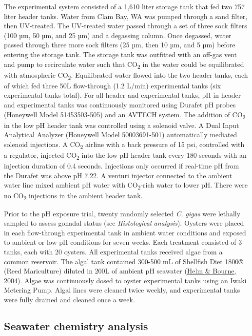 \documentclass [11pt, proquest] {uwthesis}[2015/03/03]
\begin{document}
The experimental system consisted of a 1,610 liter storage tank that fed two 757 liter header tanks. Water from Clam Bay, WA was pumped through a sand filter, then UV-treated. The UV-treated water passed through a set of three sock filters (100 µm, 50 µm, and 25 µm) and a degassing column. Once degassed, water passed through three more sock filters (25 µm, then 10 µm, and 5 µm) before entering the storage tank. The storage tank was outfitted with an off-gas vent and pump to recirculate water such that CO\textsubscript{2} in the water could be equilibrated with atmospheric CO\textsubscript{2}. Equilibrated water flowed into the two header tanks, each of which fed three 50L flow-through (1.2 L/min) experimental tanks (six experimental tanks total). For all header and experimental tanks, pH in header and experimental tanks was continuously monitored using Durafet pH probes (Honeywell Model 51453503-505) and an AVTECH system. The addition of CO\textsubscript{2} in the low pH header tank was controlled using a solenoid valve. A Dual Input Analytical Analyzer (Honeywell Model 50003691-501) automatically mediated solenoid injections. A CO\textsubscript{2} airline with a back pressure of 15 psi, controlled with a regulator, injected CO\textsubscript{2} into the low pH header tank every 180 seconds with an injection duration of 0.4 seconds. Injections only occurred if real-time pH from the Durafet was above pH 7.22. A venturi injector connected to the ambient water line mixed ambient pH water with CO\textsubscript{2}-rich water to lower pH. There were no CO\textsubscript{2} injections in the ambient header tank.

Prior to the pH exposure trial, twenty randomly selected \emph{C. gigas} were lethally sampled to assess gonadal status (see \emph{Histological analysis}). Oysters were placed in each flow-through experimental tank in ambient water conditions and exposed to ambient or low pH conditions for seven weeks. Each treatment consisted of 3 tanks, each with 20 oysters. All experimental tanks received algae from a common reservoir. The algal tank contained 300-500 mL of Shellfish Diet 1800® (Reed Mariculture) diluted in 200L of ambient pH seawater (\protect\hyperlink{ref-Helm2004}{Helm \& Bourne, 2004}). Algae was continuously dosed to oyster experimental tanks using an Iwaki Metering Pump. Algal lines were cleaned twice weekly, and experimental tanks were fully drained and cleaned once a week.

\hypertarget{seawater-chemistry-analysis}{%
\subsection{Seawater chemistry analysis}\label{seawater-chemistry-analysis}}
\end{document}
